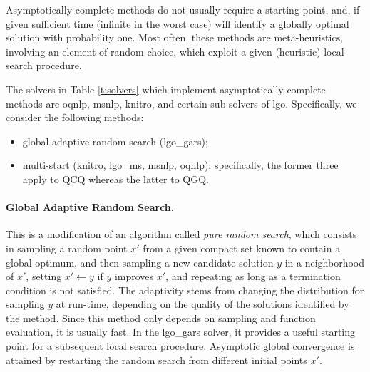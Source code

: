 Asymptotically complete methods do not usually require a starting point, and, if given sufficient time (infinite in the worst case) will identify a globally optimal solution with probability one. Most often, these methods are meta-heuristics, involving an element of random choice, which exploit a given (heuristic) local search procedure.

The solvers in Table \ref{t:solvers} which implement asymptotically complete methods are {\sc oqnlp}, {\sc msnlp}, {\sc knitro}, and certain sub-solvers of {\sc lgo}. Specifically, we consider the following methods:
%
\begin{itemize}
 \item global adaptive random search ({\sc lgo\_gars});
 \item multi-start ({\sc knitro}, {\sc lgo\_ms}, {\sc msnlp}, {\sc oqnlp}); specifically, the former three apply to QCQ whereas the latter to QGQ.
\end{itemize}

\paragraph{Global Adaptive Random Search.}
%
This is a modification of an algorithm called {\it pure random search}, which consists in sampling a random point $x'$ from a given compact set known to contain a global optimum, and then sampling a new candidate solution $y$ in a neighborhood of $x'$, setting $x' \leftarrow y$ if $y$ improves $x'$, and repeating as long as a termination condition is not satisfied. The adaptivity stems from changing the distribution for sampling $y$ at run-time, depending on the quality of the solutions identified by the method. Since this method only depends on sampling and function evaluation, it is usually fast. In the {\sc lgo\_gars} solver, it provides a useful starting point for a subsequent local search procedure. Asymptotic global convergence is attained by restarting the random search from different initial points $x'$. 

